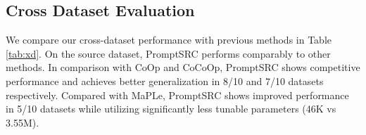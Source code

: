 \documentclass[10pt,twocolumn,letterpaper]{article}
\newcommand{\tableCellHeight}{1}
\newcommand{\tabstyle}[1]{
  \setlength{\tabcolsep}{#1}
  \renewcommand{\arraystretch}{\tableCellHeight}
  \centering
  \small
}
\begin{document}
\begin{table}[!t]
    \tabstyle{2.5pt}
    \vspace{-0.5em}
        \caption{\textnormal{Cross-dataset benchmark evaluation.} PromptSRC achieves overall favourable performance.}
    \label{tab:xd} \end{table}


%
 

\subsection{Cross Dataset Evaluation}
We compare our cross-dataset performance with previous methods in Table \ref{tab:xd}. On the source dataset, PromptSRC performs comparably to other methods. In comparison with CoOp and CoCoOp, PromptSRC shows competitive performance and achieves better generalization in 8/10 and 7/10 datasets respectively. {Compared with MaPLe, PromptSRC shows improved performance in 5/10 datasets while utilizing significantly less tunable parameters (46K vs 3.55M).} 
\end{document}
